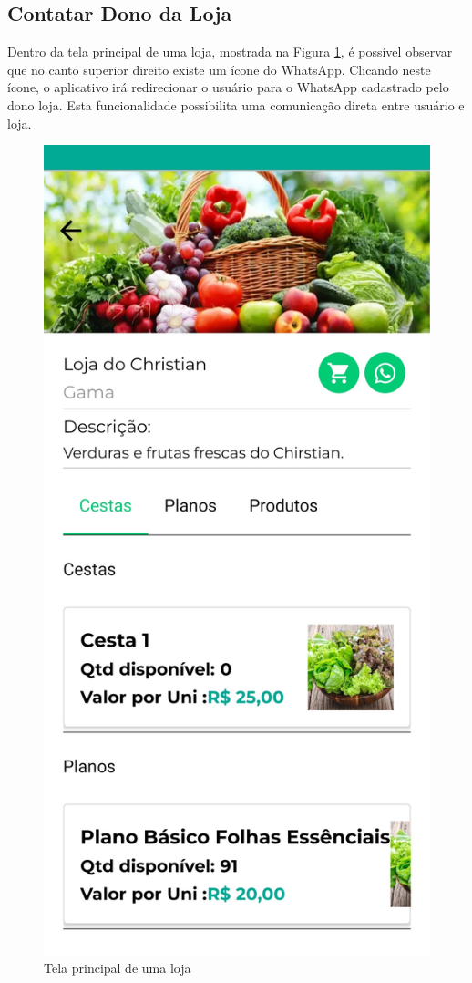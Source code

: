 \subsection{Contatar Dono da Loja}
Dentro da tela principal de uma loja, mostrada na Figura \ref{tela-loja-app}, é possível observar que no canto superior direito existe um ícone do WhatsApp. Clicando neste ícone, o aplicativo irá redirecionar o usuário para o WhatsApp cadastrado pelo dono loja. Esta funcionalidade possibilita uma comunicação direta entre usuário e loja.

\begin{figure}[h]
	\centering
	\includegraphics[keepaspectratio=true,scale=0.16]{figuras/tela_loja.jpg}
	\caption{Tela principal de uma loja}
        \label{tela-loja-app}
\end{figure}

